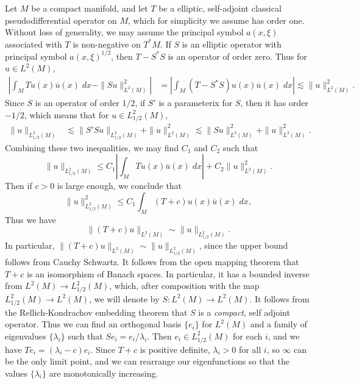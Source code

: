 Let $M$ be a compact manifold, and let $T$ be a elliptic, self-adjoint classical pseudodifferential operator on $M$, which for simplicity we assume has order one. Without loss of generality, we may assume the principal symbol $a(x,\xi)$ associated with $T$ is non-negative on $T^*M$. If $S$ is an elliptic operator with principal symbol $a(x,\xi)^{1/2}$, then $T - S^*S$ is an operator of order zero. Thus for $u \in L^2(M)$,
%
\begin{align*}
    \left| \int_M Tu(x) \overline{u}(x)\; dx - \| Su \|_{L^2(M)}^2 \right| &= \left| \int_M (T - S^* S) u(x) \overline{u}(x)\; dx \right| \lesssim \| u \|_{L^2(M)}^2.
\end{align*}
%
Since $S$ is an operator of order $1/2$, if $S'$ is a parameterix for $S$, then it has order $-1/2$, which means that for $u \in L^2_{1/2}(M)$,
%
\begin{align*}
    \| u \|_{L^2_{1/2}(M)} &\lesssim \| S'Su \|_{L^2_{1/2}(M)} + \| u \|_{L^2(M)}^2 \lesssim \| Su \|_{L^2(M)}^2 + \| u \|_{L^2(M)}^2.
\end{align*}
%
Combining these two inequalities, we may find $C_1$ and $C_2$ such that
%
\[ \| u \|_{L^2_{1/2}(M)} \leq C_1 \left| \int_M Tu(x) \overline{u}(x)\; dx \right| + C_2 \| u \|_{L^2(M)}^2. \]
%
Then if $c > 0$ is large enough, we conclude that
%
\[ \| u \|_{L^2_{1/2}(M)}^2 \leq C_1 \int_M (T + c)u(x) \overline{u}(x)\; dx, \]
%
Thus we have
%
\[ \| (T + c) u \|_{L^2(M)} \sim \| u \|_{L^2_{1/2}(M)}. \]
%
In particular, $\| (T+c)u \|_{L^2(M)} \sim \| u \|_{L^2_{1/2}(M)}$, since the upper bound follows from Cauchy Schwartz. It follows from the open mapping theorem that $T+c$ is an isomorphism of Banach spaces. In particular, it has a bounded inverse from $L^2(M) \to L^2_{1/2}(M)$, which, after composition with the map $L^2_{1/2}(M) \to L^2(M)$, we will denote by $S: L^2(M) \to L^2(M)$. It follows from the Rellich-Kondrachov embedding theorem that $S$ is a \emph{compact}, self adjoint operator. Thus we can find an orthogonal basis $\{ e_i \}$ for $L^2(M)$ and a family of eigenvalues $\{ \lambda_i \}$ such that $Se_i = e_i/\lambda_i$. Then $e_i \in L^2_{1/2}(M)$ for each $i$, and we have $Te_i = (\lambda_i - c) e_i$. Since $T + c$ is positive definite, $\lambda_i > 0$ for all $i$, so $\infty$ can be the only limit point, and we can rearrange our eigenfunctions so that the values $\{ \lambda_i \}$ are monotonically increasing.

